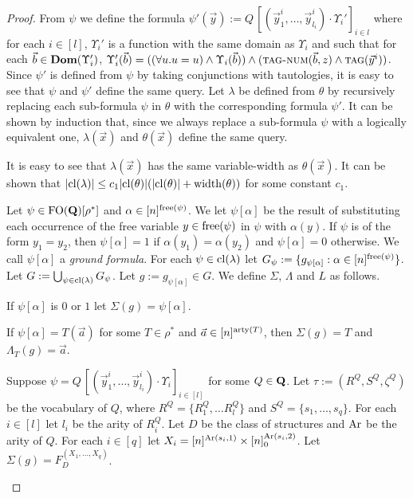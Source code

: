 \documentclass[../main/thesis.tex]{subfiles}
\begin{document}
\begin{proof}
  From $\psi$ we define the formula $\psi' (\vec{y}) := Q \, [(\vec{y}^i_1,
  \ldots, \vec{y}^i_{l_i}) \cdot \Upsilon_i']_{i \in l}$ where for each $i \in
  [l]$, $\Upsilon_i'$ is a function with the same domain as $\Upsilon_i$ and
  such that for each $\vec{b} \in \text{\textbf{Dom}}(\Upsilon_i')$, $\Upsilon_i' (\vec{b}) =
  ((\forall u . u = u) \land \Upsilon_i(\vec{b})) \land ({\normalfont\textsc{tag-num}}(\vec{b},
  z) \land {\normalfont\textsc{tag}}(\vec{y}^i))$. Since $\psi'$ is defined from $\psi$ by taking
  conjunctions with tautologies, it is easy to see that $\psi$ and $\psi'$
  define the same query. Let $\lambda$ be defined from $\theta$ by recursively
  replacing each sub-formula $\psi$ in $\theta$ with the corresponding formula
  $\psi'$. It can be shown by induction that, since we always replace a
  sub-formula $\psi$ with a logically equivalent one, $\lambda (\vec{x})$ and
  $\theta (\vec{x})$ define the same query.

  It is easy to see that $\lambda(\vec{x})$ has the same variable-width as
  $\theta(\vec{x})$. It can be shown that $\vert \mathrm{cl}(\lambda)\vert \leq c_1
  \vert \mathrm{cl}(\theta) \vert (\vert \mathrm{cl}(\theta) \vert + \mathrm{width}(\theta))$ for some
  constant $c_1$.

  Let $\psi \in \text{\upshape FO}(\mathbf{Q})[\rho^*]$ and $\alpha \in [n]^{\mathrm{free}(\psi)}$. We
  let $\psi[\alpha]$ be the result of substituting each occurrence of the free
  variable $y \in \mathrm{free}(\psi)$ in $\psi$ with $\alpha(y)$. If $\psi$ is of the
  form $y_1 = y_2$, then $\psi [\alpha] = 1$ if $\alpha(y_1) = \alpha (y_2)$ and
  $\psi[\alpha] = 0$ otherwise. We call $\psi[\alpha]$ a \emph{ground formula}.
  For each $\psi \in \mathrm{cl}(\lambda)$ let $G_\psi := \{g_{\psi[\alpha]} : \alpha
  \in [n]^{\mathrm{free}(\psi)} \}$. Let $G := \bigcup_{\psi \in \mathrm{cl}(\lambda)}
  G_{\psi}$. Let $g := g_{\psi[\alpha]} \in G$. We define $\Sigma$, $\Lambda$
  and $L$ as follows.
  \begin{myitemize}
  \item If $\psi[\alpha]$ is $0$ or $1$ let $\Sigma (g) = \psi[\alpha]$.
  \item If $\psi[\alpha] = T(\vec{a})$ for some $T \in \rho^*$ and $\vec{a} \in
    [n]^{\mathrm{arty}(T)}$, then $\Sigma (g) = T$ and $\Lambda_T (g) = \vec{a}$.
  \item Suppose $\psi = Q \, [(\vec{y}^i_1, \ldots, \vec{y}^i_{l_i}) \cdot
    \Upsilon_i]_{i \in [l]}$ for some $Q \in \mathbf{Q}$. Let $\tau := (R^Q, S^Q,
    \zeta^Q)$ be the vocabulary of $Q$, where $R^{Q} = \{R^{Q}_1, \ldots
    R^{Q}_l\}$ and $S^Q = \{s_1, \ldots, s_q\}$. For each $i \in [l]$ let $l_i$
    be the arity of $R^{Q}_i$. Let $D$ be the class of structures and $\text{\upshape Ar}$ be
    the arity of $Q$. For each $i \in [q]$ let $X_i = [n]^{\text{\upshape Ar}(s_i, 1)} \times
    [n]^{\text{\upshape Ar}(s_i, 2)}_0$. Let $\Sigma (g) = F^{(X_1, \ldots, X_q)}_{D}$.


\end{myitemize}
\end{proof}
\end{document}
